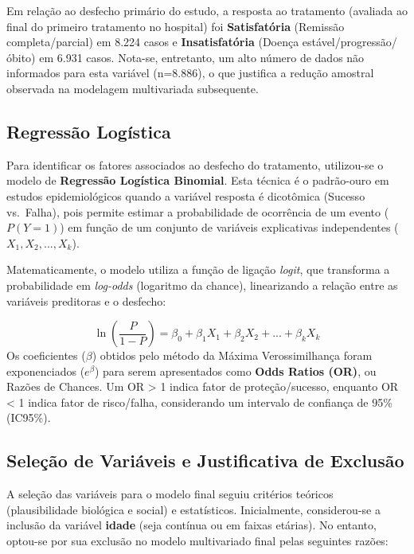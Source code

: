 \documentclass[
]{article}
\begin{document}
Em relação ao desfecho primário do estudo, a resposta ao tratamento
(avaliada ao final do primeiro tratamento no hospital) foi
\textbf{Satisfatória} (Remissão completa/parcial) em 8.224 casos e
\textbf{Insatisfatória} (Doença estável/progressão/óbito) em 6.931
casos. Nota-se, entretanto, um alto número de dados não informados para
esta variável (n=8.886), o que justifica a redução amostral observada na
modelagem multivariada subsequente.

\subsection{Regressão Logística}\label{regressuxe3o-loguxedstica}

Para identificar os fatores associados ao desfecho do tratamento,
utilizou-se o modelo de \textbf{Regressão Logística Binomial}. Esta
técnica é o padrão-ouro em estudos epidemiológicos quando a variável
resposta é dicotômica (Sucesso vs.~Falha), pois permite estimar a
probabilidade de ocorrência de um evento (\(P(Y=1)\)) em função de um
conjunto de variáveis explicativas independentes
(\(X_1, X_2, ..., X_k\)).

Matematicamente, o modelo utiliza a função de ligação \emph{logit}, que
transforma a probabilidade em \emph{log-odds} (logaritmo da chance),
linearizando a relação entre as variáveis preditoras e o desfecho:

\[\ln\left(\frac{P}{1-P}\right) = \beta_0 + \beta_1X_1 + \beta_2X_2 + ... + \beta_kX_k\]
Os coeficientes (\(\beta\)) obtidos pelo método da Máxima
Verossimilhança foram exponenciados (\(e^\beta\)) para serem
apresentados como \textbf{Odds Ratios (OR)}, ou Razões de Chances. Um OR
\textgreater{} 1 indica fator de proteção/sucesso, enquanto OR
\textless{} 1 indica fator de risco/falha, considerando um intervalo de
confiança de 95\% (IC95\%).

\subsection{Seleção de Variáveis e Justificativa de
Exclusão}\label{seleuxe7uxe3o-de-variuxe1veis-e-justificativa-de-exclusuxe3o}

A seleção das variáveis para o modelo final seguiu critérios teóricos
(plausibilidade biológica e social) e estatísticos. Inicialmente,
considerou-se a inclusão da variável \textbf{idade} (seja contínua ou em
faixas etárias). No entanto, optou-se por sua exclusão no modelo
multivariado final pelas seguintes razões:
\end{document}
